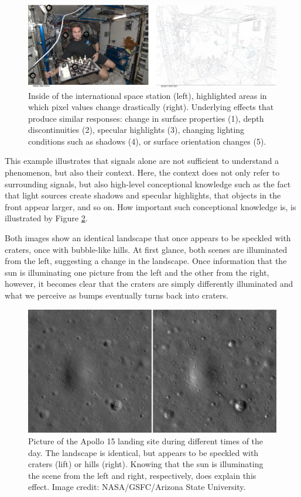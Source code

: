 \begin{figure}[!htb]
	\centering
		\includegraphics[width=\textwidth]{figs/iss_edges}
	\caption{Inside of the international space station (left), highlighted areas in which pixel values change drastically (right). Underlying effects that produce similar responses: change in surface properties (1), depth discontinuities (2), specular highlights (3), changing lighting conditions such as shadows (4), or surface orientation changes (5).
	\label{fig:iss_edges}}
\end{figure}

This example illustrates that signals alone are not sufficient to understand a phenomenon, but also their context. Here, the context does not only refer to surrounding signals, but also high-level conceptional knowledge such as the fact that light sources create shadows and specular highlights, that objects in the front appear larger, and so on. How important such conceptional knowledge is, is illustrated by Figure \ref{fig:craters}.

Both images show an identical landscape that once appears to be speckled with craters, once with bubble-like hills. At first glance, both scenes are illuminated from the left, suggesting a change in the landscape. Once information that the sun is illuminating one picture from the left and the other from the right, however, it becomes clear that the craters are simply differently illuminated and what we perceive as bumps eventually turns back into craters. 

\begin{figure}[!htb]
	\centering
		\includegraphics[width=\textwidth]{figs/craters}
	\caption{Picture of the Apollo 15 landing site during different times of the day. The landscape is identical, but appears to be speckled with craters (lift) or hills (right). Knowing that the sun is illuminating the scene from the left and right, respectively, does explain this effect. Image credit: NASA/GSFC/Arizona State University.
	\label{fig:craters}}
\end{figure}

